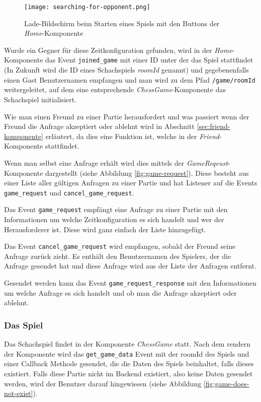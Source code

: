 \begin{figure}[h]
\centering
\texttt{[image: searching-for-opponent.png]}
\caption{Lade-Bildschirm beim Starten eines Spiels mit den Buttons der \textit{Home}-Komponente}
\label{fig:searching-for-opponent}
\end{figure}

Wurde ein Gegner für diese Zeitkonfiguration gefunden, wird in der \textit{Home}-Komponente das Event \verb|joined_game| mit einer ID unter der das Spiel stattfindet (In Zukunft wird die ID eines Schachspiels \textit{roomId} genannt) und gegebenenfalls einen Gast Benutzernamen empfangen und man wird zu dem Pfad \verb|/game/roomId| weitergeleitet, auf dem eine entsprechende \textit{ChessGame}-Komponente das Schachspiel initialisiert.

Wie man einen Freund zu einer Partie herausfordert und was passiert wenn der Freund die Anfrage akzeptiert oder ablehnt wird in Abschnitt \ref{sec:friend-komponente} erläutert, da dies eine Funktion ist, welche in der \textit{Friend}-Komponente stattfindet.

Wenn man selbst eine Anfrage erhält wird dies mittels der \textit{GameReqeust}-Komponente dargestellt (siehe Abbildung \ref{fig:game-request}). Diese besteht aus einer Liste aller gültigen Anfragen zu einer Partie und hat Listener auf die Events \verb|game_request| und \verb|cancel_game_request|. 

Das Event \verb|game_request| empfängt eine Anfrage zu einer Partie mit den Informationen um welche Zeitkonfiguration es sich handelt und wer der Herausforderer ist. Diese wird ganz einfach der Liste hinzugefügt. 

Das Event \verb|cancel_game_request| wird empfangen, sobald der Freund seine Anfrage zurück zieht. Es enthält den Benutzernamen des Spielers, der die Anfrage gesendet hat und diese Anfrage wird aus der Liste der Anfragen entfernt.

Gesendet werden kann das Event \verb|game_request_response| mit den Informationen um welche Anfrage es sich handelt und ob man die Anfrage akzeptiert oder ablehnt.
        \subsubsection{Das Spiel}
        \label{sec:Das-Schachspiel-Front}
Das Schachspiel findet in der Komponente \textit{ChessGame} statt.
Nach dem rendern der Komponente wird das \verb|get_game_data| Event mit der roomId des Spiels und einer Callback Methode gesendet, die die Daten des Spiels beinhaltet, falls dieses existiert. Falls diese Partie nicht im Backend existiert, also keine Daten gesendet werden, wird der Benutzer darauf hingewiesen (siehe Abbildung \ref{fig:game-does-not-exist}).

